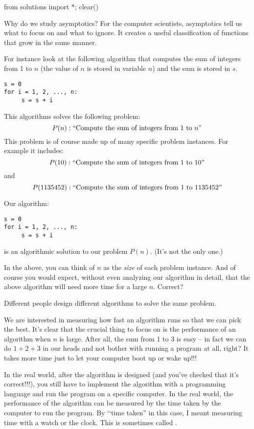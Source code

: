 \begin{python0}
from solutions import *; clear()
\end{python0}

Why do we study asymptotics? For the computer scientists,
asymptotics tell us what to focus on and what to ignore.
It creates a useful classification of functions that grow in the
same manner. 

For instance look at the following algorithm that
computes the sum of integers from 1 to $n$ (the value of $n$ is
stored in variable $n$) and the sum is stored in
$s$.
\begin{Verbatim}[frame=single, fontsize=\footnotesize]
s = 0
for i = 1, 2, ..., n:
     s = s + i
\end{Verbatim}
This algorithms solves the following problem:
\[
P(n): \text{\lq\lq Compute the sum of integers from $1$ to $n$''}
\]
This problem is of course made up of many specific problem instances.
For example it includes: 
\[
P(10): \text{\lq\lq Compute the sum of integers from $1$ to $10$''}
\]
and
\[ 
P(1135452): \text{\lq\lq Compute the sum of integers from $1$ to $1135452$''}
\]

Our algorithm:
\begin{Verbatim}[frame=single, fontsize=\footnotesize]
s = 0
for i = 1, 2, ..., n:
     s = s + i
\end{Verbatim}
is an algorithmic solution to our problem $P(n)$.
(It's not the only one.)

In the above, you can think of $n$ as the \textit{size} of each problem
instance.
And of course you would expect, without even analyzing our
algorithm in detail, that the above algorithm will need more time
for a large $n$. Correct?

Different people design different algorithms to solve the same problem.

We are interested in measuring how fast an algorithm runs
so that we can pick the best.
It's clear that the crucial thing to focus on is the performance
of an algorithm when $n$ is large.
After all, the sum from 1 to 3 is easy --
in fact we can do $1+2+3$ in our heads and not bother with
running a program at all, right?
It takes more time just to let your computer boot up or wake up!!!

In the real world, 
after the algorithm is designed (and you've checked that it's 
correct!!!), 
you still have to implement the algorithm with a programming language
and run the program on a specific computer.
In the real world, the performance of the algorithm can be measured by the
time taken by the computer to run the program.
By \lq\lq time taken'' in this case, I meant measuring time with a
watch or the clock.
This is sometimes called .

